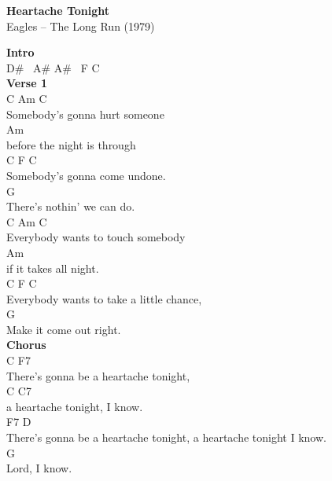 \documentclass[a4paper]{article}
\begin{document}
    \begin{center}
        \textbf{Heartache Tonight}
        ~\\
        Eagles -- The Long Run (1979)
    \end{center}
    {
        \scriptsize
        \textbf{Intro}
        ~\\
        {
            \cutive
            \obeyspaces
D\# \ A\#  A\# \ F   C
\\

        }
        \textbf{Verse 1}
        ~\\
        {
            \cutive
            \obeyspaces
C                Am          C
\\
Somebody's gonna hurt someone 
\\
                    Am
\\
before the night is through 
\\
C                F           C
\\
Somebody's gonna come undone.
\\
                       G
\\
There's nothin' we can do. 
\\
C                  Am            C
\\
Everybody wants to touch somebody 
\\
                Am
\\
if it takes all night. 
\\
C                  F                     C
\\
Everybody wants to take a little chance, 
\\
                 G
\\
Make it come out right. 
\\

        }
        \textbf{Chorus}
        ~\\
        {
            \cutive
            \obeyspaces
C                  F7
\\
There's gonna be a heartache tonight, 
\\
                       C    C7
\\
a heartache tonight, I know. 
\\
                   F7                                       D
\\
There's gonna be a heartache tonight, a heartache tonight I know. 
\\
        G
\\
Lord, I know. 
\\

}}
\end{document}
